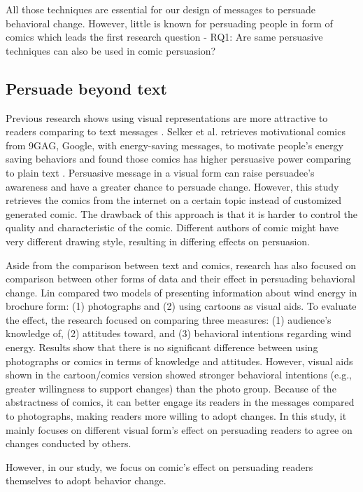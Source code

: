 All those techniques are essential for our design of messages to persuade behavioral change. However, little is known for persuading people in form of comics which leads the first research question - RQ1: Are same persuasive techniques can also be used in comic persuasion?

\subsection{Persuade beyond text}
Previous research shows using visual representations are more attractive to readers comparing to text messages \cite{selker2015sweetbuildinggreeter,lin2013impact,scott1993understanding}. Selker et al. retrieves motivational comics from 9GAG, Google, with energy-saving messages, to motivate people's energy saving behaviors and found those comics has higher persuasive power comparing to plain text \cite{selker2015sweetbuildinggreeter}. Persuasive message in a visual form can raise persuadee's awareness and have a greater chance to persuade change. However, this study retrieves the comics from the internet on a certain topic instead of customized generated comic. The drawback of this approach is that it is harder to control the quality and characteristic of the comic. Different authors of comic might have very different drawing style, resulting in differing effects on persuasion.

Aside from the comparison between text and comics, research has also focused on comparison between other forms of data and their effect in persuading behavioral change. Lin \cite{lin2013impact} compared two models of presenting information about wind energy in brochure form: (1) photographs and (2) using cartoons as visual aids. To evaluate the effect, the research focused on comparing three measures: (1) audience's knowledge of, (2) attitudes toward, and (3) behavioral intentions regarding wind energy. Results show that there is no significant difference between using photographs or comics in terms of knowledge and attitudes. However, visual aids shown in the cartoon/comics version showed stronger behavioral intentions (e.g., greater willingness to support changes) than the photo group. Because of the abstractness of comics, it can better engage its readers in the messages compared to photographs, making readers more willing to adopt changes. In this study, it mainly focuses on different visual form's effect on persuading readers to agree on changes conducted by others.


However, in our study, we focus on comic's effect on persuading readers themselves to adopt behavior change.




